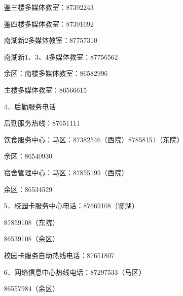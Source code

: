 \documentclass[UTF8,12pt,a4paper]{report}
\begin{document}
鉴三楼多媒体教室：87392243

鉴四楼多媒体教室：87391692

南湖新2多媒体教室：87757310

南湖新1、3、4多媒体教室：87756562

余区：南楼多媒体教室：86582996

主楼多媒体教室：86566615

4．后勤服务电话

后勤服务热线：87651111

饮食服务中心：马区：87382546（西院）87858151（东院）

余区：86540930

宿舍管理中心：马区：87855199（西院）

余区：86534529

5．校园卡服务中心电话：87669108（鉴湖）

87859108（东院）

86539108（余区）

校园卡服务自助热线电话：87651807

6．网络信息中心热线电话：87297533（马区）

86557984（余区）
\end{document}
